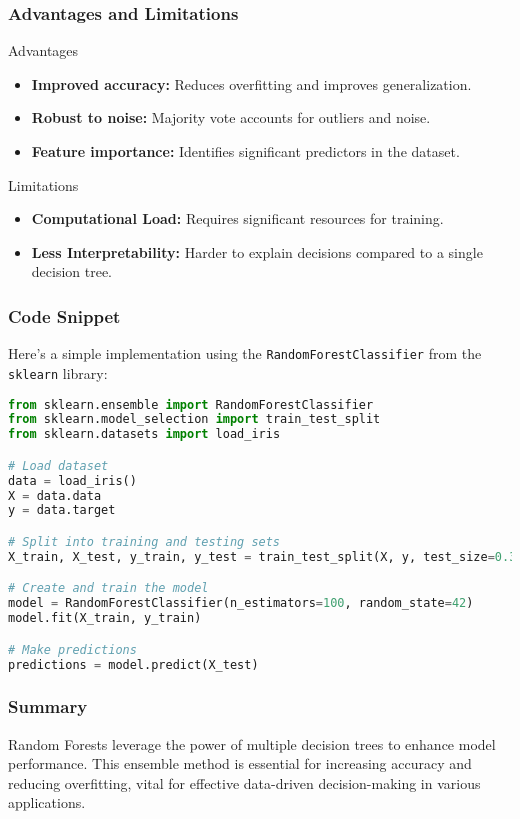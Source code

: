 \documentclass[aspectratio=169]{beamer}
\begin{document}
\begin{frame}[fragile]
    \frametitle{Advantages and Limitations}
    \begin{block}{Advantages}
        \begin{itemize}
            \item \textbf{Improved accuracy:} Reduces overfitting and improves generalization.
            \item \textbf{Robust to noise:} Majority vote accounts for outliers and noise.
            \item \textbf{Feature importance:} Identifies significant predictors in the dataset.
        \end{itemize}
    \end{block}
    
    \begin{block}{Limitations}
        \begin{itemize}
            \item \textbf{Computational Load:} Requires significant resources for training.
            \item \textbf{Less Interpretability:} Harder to explain decisions compared to a single decision tree.
        \end{itemize}
    \end{block}
\end{frame}

\begin{frame}[fragile]
    \frametitle{Code Snippet}
    Here’s a simple implementation using the \texttt{RandomForestClassifier} from the \texttt{sklearn} library:
    \begin{lstlisting}[language=Python]
from sklearn.ensemble import RandomForestClassifier
from sklearn.model_selection import train_test_split
from sklearn.datasets import load_iris

# Load dataset
data = load_iris()
X = data.data
y = data.target

# Split into training and testing sets
X_train, X_test, y_train, y_test = train_test_split(X, y, test_size=0.3, random_state=42)

# Create and train the model
model = RandomForestClassifier(n_estimators=100, random_state=42)
model.fit(X_train, y_train)

# Make predictions
predictions = model.predict(X_test)
    \end{lstlisting}
\end{frame}

\begin{frame}[fragile]
    \frametitle{Summary}
    Random Forests leverage the power of multiple decision trees to enhance model performance. 
    This ensemble method is essential for increasing accuracy and reducing overfitting, vital for effective data-driven decision-making in various applications.
\end{frame}
\end{document}
